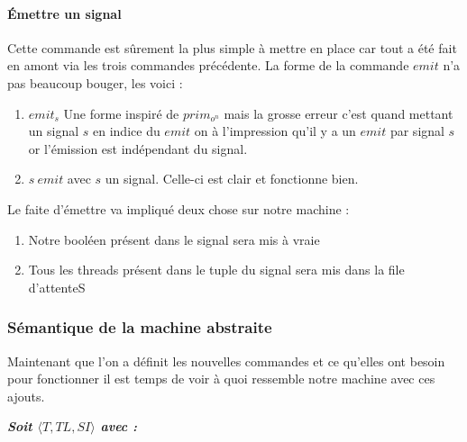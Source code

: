 \documentclass[10pt,a4paper]{article}
\begin{document}
						
				\paragraph{Émettre un signal}
						
					Cette commande est sûrement la plus simple à mettre en place car tout a été fait en amont via les trois commandes précédente. La forme de la commande $emit$ n'a pas beaucoup bouger, les voici :
					\begin{enumerate}
						\item $emit_{s}$ Une forme inspiré de $prim_{o^{n}}$ mais la grosse erreur c'est quand mettant un signal $s$ en indice du $emit$ on à l'impression qu'il y a un $emit$ par signal $s$ or l'émission est indépendant du signal.
						\item $s~emit$ avec $s$ un signal. Celle-ci est clair et fonctionne bien. 
					\end{enumerate}
					\medbreak
						
					Le faite d'émettre va impliqué deux chose sur notre machine :
					\begin{enumerate}					
						\item Notre booléen présent dans le signal sera mis à vraie
						\item Tous les threads présent dans le tuple du signal sera mis dans la file d'attenteS 
					\end{enumerate} 
					\bigbreak
					\bigbreak
				
				
					
					
			\subsubsection{Sémantique de la machine abstraite}
				
				Maintenant que l'on a définit les nouvelles commandes et ce qu'elles ont besoin pour fonctionner il est temps de voir à quoi ressemble notre machine avec ces ajouts.
				\bigbreak
					
					
				\textbf{\textit{Soit $\langle T,TL,SI\rangle$ avec :}}
					
\end{document}
